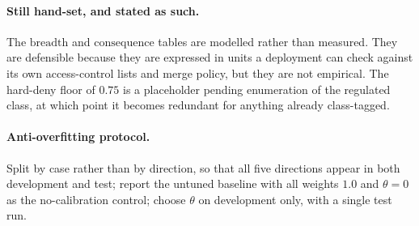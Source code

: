 \documentclass[conference,compsoc]{IEEEtran}
\begin{document}
\paragraph{Still hand-set, and stated as such.} The $\mathrm{breadth}$ and
$\mathrm{consequence}$ tables are modelled rather than measured. They are
defensible because they are expressed in units a deployment can check against
its own access-control lists and merge policy, but they are not empirical.
The hard-deny floor of $0.75$ is a placeholder pending enumeration of the
regulated class, at which point it becomes redundant for anything already
class-tagged.

\paragraph{Anti-overfitting protocol.} Split by case rather than by direction,
so that all five directions appear in both development and test; report the
untuned baseline with all weights $1.0$ and $\theta = 0$ as the no-calibration
control; choose $\theta$ on development only, with a single test run.
\end{document}
